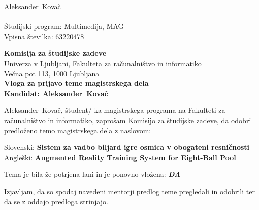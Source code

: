 \documentclass[a4paper, 12pt]{article}
\begin{document}
\newcommand{\ImeKandidata}{Aleksander} %
\newcommand{\PriimekKandidata}{Kovač} %
\newcommand{\VpisnaStevilka}{63220478} %
\newcommand{\StudijskiProgram}{Multimedija, MAG} %
\newcommand{\NaslovBivalisca}{} %
\newcommand{\SLONaslov}{Sistem za vadbo biljard igre osmica v obogateni resničnosti} %
\newcommand{\ENGNaslov}{Augmented Reality Training System for Eight-Ball Pool} %


\newcommand{\ProblemParagraph}{\noindent\textbf{Problem in pregled stanja tehnike.} }
\newcommand{\ContributionsParagraph}{\noindent\textbf{Pričakovani znanstveni ali tehnični prispevki. } }
\newcommand{\MethodologyParagraph}{\noindent\textbf{Metodologija in ovrednotenje. } }

\newcommand{\Kandidat}{\ImeKandidata~\PriimekKandidata}
\noindent
\Kandidat\\
\NaslovBivalisca \\
Študijski program: \StudijskiProgram \\
Vpisna številka: \VpisnaStevilka
\bigskip

{\bf Komisija za študijske zadeve}\\
Univerza v Ljubljani, Fakulteta za računalništvo in informatiko\\
Večna pot 113, 1000 Ljubljana\\

{\Large\bf
{\centering
    Vloga za prijavo teme magistrskega dela \\%
\large Kandidat: \Kandidat \\[10mm]}}


\Kandidat, študent/-ka magistrskega programa na Fakulteti za računalništvo in informatiko, zaprošam Komisijo za študijske zadeve, da odobri predloženo temo magistrskega dela z naslovom:

Slovenski: {\bf \SLONaslov}\\
Angleški: {\bf \ENGNaslov}

Tema je bila že potrjena lani in je ponovno vložena: {\bf \textit{DA} }

Izjavljam, da so spodaj navedeni mentorji predlog teme pregledali in odobrili ter da se z oddajo predloga strinjajo.
\end{document}
